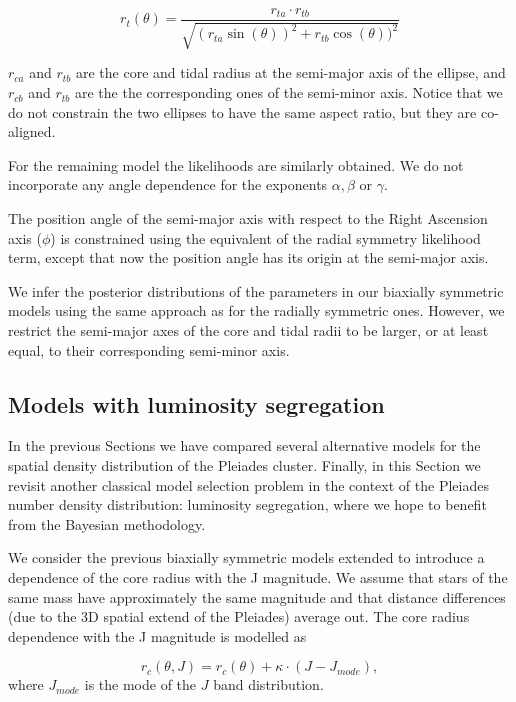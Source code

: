 \begin{equation}
r_t(\theta) = \frac{r_{ta}\cdot r_{tb}}{\sqrt{(r_{ta}\sin(\theta))^2+r_{tb}\cos(\theta))^2}}
\label{eq:anglert}
\end{equation}

$r_{ca}$ and $r_{tb}$ are the core and tidal radius at the semi-major axis of the ellipse, and $r_{cb}$
and $r_{tb}$ are the the corresponding ones of the semi-minor axis. Notice that we do not
constrain the two ellipses to have the same aspect ratio, but they are co-aligned.

For the remaining model the likelihoods are similarly obtained. We
do not incorporate any angle dependence for the exponents $\alpha,\beta$ or $\gamma$.  

The position angle of the semi-major axis with respect to the Right
Ascension axis ($\phi$) is constrained using the equivalent of the
radial symmetry likelihood term, except that now the position angle has
its origin at the semi-major axis.

We infer the posterior distributions of the parameters in our biaxially symmetric models using
the same approach as for the radially symmetric ones. However, we restrict
the semi-major axes of the core and tidal radii to be larger, or at least equal, to their corresponding semi-minor axis.

\subsection{Models with luminosity segregation}
\label{sec:lumin-segreg}
In the previous Sections we have compared several alternative models
for the spatial density distribution of the Pleiades
cluster. Finally, in this Section we revisit another classical model selection problem in the
context of the Pleiades number density distribution: luminosity segregation, where we hope to
benefit from the Bayesian methodology.

We consider the previous biaxially symmetric models extended to introduce
a dependence of the core radius with the J magnitude. We assume that stars of the same
mass have approximately the same magnitude and that distance
differences (due to the 3D spatial extend of the Pleiades) average
out. The core radius dependence with the J magnitude is modelled as

\begin{equation}
  r_c(\theta,J) = r_c(\theta)+\kappa\cdot(J- J_{mode}),
\end{equation}
where $J_{mode}$ is the mode of the $J$ band distribution. 


